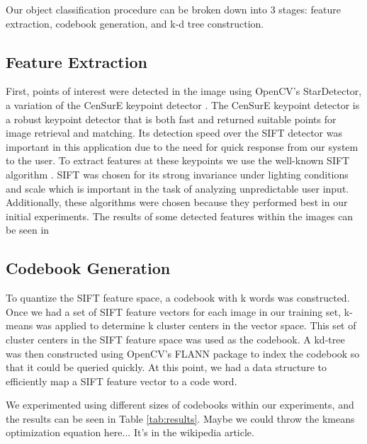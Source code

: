 Our object classification procedure can be broken down into 3 stages: feature
extraction, codebook generation, and k-d tree construction.

\subsection{Feature Extraction}
First, points of interest were detected in the image using OpenCV's StarDetector,
a variation of the CenSurE keypoint detector \cite{agrawal2008censure}. 
The CenSurE keypoint detector is a robust keypoint detector that is both fast and returned suitable points for image retrieval and matching.
Its detection speed over the SIFT detector was important in this application due to the need for quick response from our system to the user.
To extract features at these keypoints we use the well-known SIFT algorithm \cite{lowe1999object}. 
SIFT was chosen for its strong invariance under lighting conditions and scale which is important in the task of analyzing unpredictable user input. 
Additionally, these algorithms were chosen because they performed best in our initial experiments.
The results of some detected features within the images can be seen in 

\subsection{Codebook Generation}
To quantize the SIFT feature space, a codebook with k words was constructed.
Once we had a set of SIFT feature vectors for each image in our training set, k-means was applied to determine k cluster centers in the vector space. 
This set of cluster centers in the SIFT feature space was used as the codebook. 
A kd-tree was then constructed using OpenCV's FLANN \cite{muja2009fast} package to index the codebook so that it could be queried quickly. 
At this point, we had a data structure to efficiently map a SIFT feature vector to a code word.

We experimented using different sizes of codebooks within our experiments, and the results can be seen in Table \ref{tab:results}.
{\color{red} Maybe we could throw the kmeans optimization equation here... It's in the wikipedia article}.


